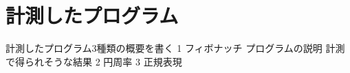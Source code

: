 \chapter{計測したプログラム}
\label{cha:program}
計測したプログラム3種類の概要を書く
1 フィボナッチ
    プログラムの説明
    計測で得られそうな結果
2 円周率
3 正規表現